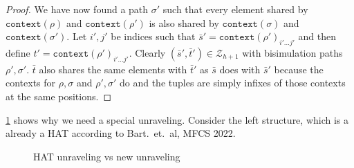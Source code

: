 \documentclass[draft]{scrartcl}
\theoremstyle{definition}
\newcommand{\context}[1]{\mathtt{context}(#1)}
\begin{document}
\begin{proof}
  We have now found a path $\sigma'$ such that every element shared by $\context{\rho}$ and $\context{\rho'}$ is also shared by $\context{\sigma}$ and $\context{\sigma'}$.
  Let $i',j'$ be indices such that $\bar{s}' = \context{\rho'}_{i'\ldots{}j'}$ and then define $t' = \context{\rho'}_{i'\ldots{}j'}$.
  Clearly $(\bar{s}', \bar{t}') \in \mathcal{Z}_{h+1}$ with bisimulation paths $\rho', \sigma'$.
  $\bar{t}$ also shares the same elements with $\bar{t}'$ as $\bar{s}$ does with $\bar{s}'$ because the contexts for $\rho, \sigma$ and $\rho', \sigma'$ do and the tuples are simply infixes of those contexts at the same positions.
\end{proof}

\cref{fig:fgf-vs-bart-unraveling} shows why we need a special unraveling.
Consider the left structure, which is a already a HAT according to Bart.\ et.\ al, MFCS 2022.

\begin{figure}
  
  \caption{HAT unraveling vs new unraveling}\label{fig:fgf-vs-bart-unraveling}
\end{figure}
\end{document}
